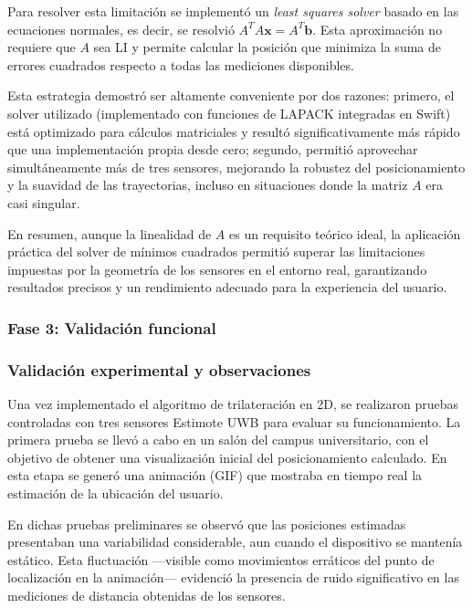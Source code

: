 Para resolver esta limitación se implementó un \textit{least squares solver} basado en las ecuaciones normales, es decir, se resolvió $A^TA \mathbf{x} = A^T \mathbf{b}$. Esta aproximación no requiere que $A$ sea LI y permite calcular la posición que minimiza la suma de errores cuadrados respecto a todas las mediciones disponibles. %

Esta estrategia demostró ser altamente conveniente por dos razones: primero, el solver utilizado (implementado con funciones de LAPACK integradas en Swift) está optimizado para cálculos matriciales y resultó significativamente más rápido que una implementación propia desde cero; segundo, permitió aprovechar simultáneamente más de tres sensores, mejorando la robustez del posicionamiento y la suavidad de las trayectorias, incluso en situaciones donde la matriz $A$ era casi singular. %

En resumen, aunque la linealidad de $A$ es un requisito teórico ideal, la aplicación práctica del solver de mínimos cuadrados permitió superar las limitaciones impuestas por la geometría de los sensores en el entorno real, garantizando resultados precisos y un rendimiento adecuado para la experiencia del usuario.

\subsubsection{Fase 3: Validación funcional}
\subsubsection*{Validación experimental y observaciones}

Una vez implementado el algoritmo de trilateración en 2D, se realizaron pruebas controladas con tres sensores Estimote UWB para evaluar su funcionamiento. La primera prueba se llevó a cabo en un salón del campus universitario, con el objetivo de obtener una visualización inicial del posicionamiento calculado. En esta etapa se generó una animación (GIF) que mostraba en tiempo real la estimación de la ubicación del usuario.


En dichas pruebas preliminares se observó que las posiciones estimadas presentaban una variabilidad considerable, aun cuando el dispositivo se mantenía estático. Esta fluctuación —visible como movimientos erráticos del punto de localización en la animación— evidenció la presencia de ruido significativo en las mediciones de distancia obtenidas de los sensores.

